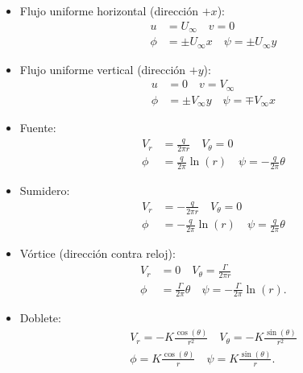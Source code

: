 \begin{itemize}
\item Flujo uniforme horizontal (dirección $+x$):
\begin{align}
u &= U_\infty \quad v = 0 \nonumber \\
\phi&=\pm U_\infty x \quad \psi= \pm U_\infty y
\end{align}

\item Flujo uniforme vertical (dirección $+y$):
\begin{align}
u &= 0 \quad v = V_\infty \nonumber \\
\phi&=\pm V_\infty y \quad \psi= \mp V_\infty x
\end{align}

\item Fuente:
\begin{align}
V_r &= \frac{q}{2\pi r}\quad V_\theta=0\nonumber\\
\phi&=\frac{q}{2\pi}\ln(r) \quad \psi=-\frac{q}{2\pi}\theta
\end{align}

\item Sumidero:
\begin{align}
V_r &= -\frac{q}{2\pi r}\quad V_\theta=0\nonumber\\
\phi&=-\frac{q}{2\pi}\ln(r) \quad \psi=\frac{q}{2\pi}\theta
\end{align}

\item Vórtice (dirección contra reloj):
\begin{align}
V_r &= 0 \quad V_\theta=\frac{\Gamma}{2\pi r}\nonumber\\
\phi&=\frac{\Gamma}{2\pi}\theta \quad \psi = -\frac{\Gamma}{2\pi}\ln(r).
\end{align}

\item Doblete: 
\begin{align}
V_r = -K\frac{\cos(\theta)}{r^2}\quad V_\theta = -K\frac{\sin(\theta)}{r^2}\nonumber\\
\phi=K\frac{\cos(\theta)}{r}\quad \psi = K\frac{\sin(\theta)}{r}.
\end{align}

\end{itemize}

